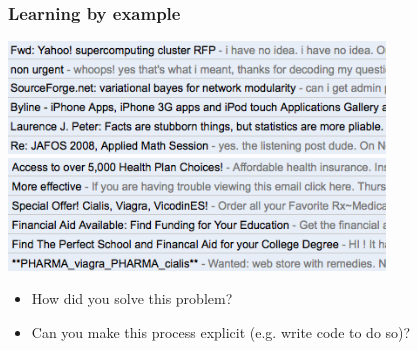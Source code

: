 \begin{frame}
  \frametitle{Learning by example}

    \begin{center}
      \includegraphics[width=0.75\textwidth]{email_ham.png}
      \includegraphics[width=0.75\textwidth]{email_spam.png}
    \end{center}

    \begin{itemize}
      \pause
      \item How did you solve this problem?
      \item \alert<2>{Can you make this process explicit (e.g. write code to do so)?}
    \end{itemize}

\end{frame}


